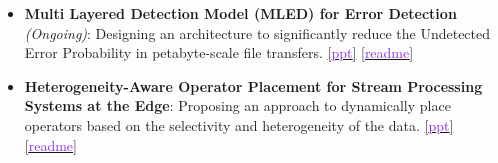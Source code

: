 \documentclass[10pt,a4paper,calibri]{moderncv}
\begin{document}
\begin{itemize}
  \item \textbf{Multi Layered Detection Model (MLED) for Error Detection} \textit{(Ongoing)}: Designing an architecture 
  to significantly reduce the Undetected Error Probability in petabyte-scale file transfers.
  \href{https://docs.google.com/presentation/d/1W_REQ6JN4Z17PV5PPEUSalE829oVi6tP/edit?usp=drive_link&ouid=111208771990960831325&rtpof=true&sd=true}{[\textcolor{blueviolet}{ppt}]}
  \href{https://github.com/shubham-sudo/mled}{[\textcolor{blueviolet}{readme}]}


  \item \textbf{Heterogeneity-Aware Operator Placement for Stream Processing Systems at the Edge}: Proposing
  an approach to dynamically place operators based on the selectivity and heterogeneity of the data.
  \href{https://docs.google.com/presentation/d/1aD28E6t7_gmsuiYY4dATWUFKkzRcipnO/edit?usp=sharing&ouid=111208771990960831325&rtpof=true&sd=true}{[\textcolor{blueviolet}{ppt}]}
  \href{https://github.com/shubham-sudo/HeterogeneityAwareOperatorPlacementforStreamProcessingSystemsAtEdge-RaspberryPi}{[\textcolor{blueviolet}{readme}]}



\end{itemize}
\end{document}
